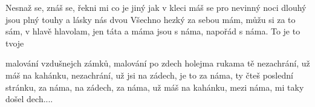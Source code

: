 \resetVars
{}
\MakeHeader
\Lyrics

Nesnaž se, znáš se,
řekni mi co je jiný
jak v kleci máš se
pro nevinný
noci dlouhý jsou plný touhy
a lásky nás dvou
Všechno hezký za sebou mám,
můžu si za to sám,
v hlavě hlavolam,
jen táta a máma jsou s náma,
napořád s náma. To je to tvoje

malování vzdušnejch zámků,
malování po zdech holejma rukama tě
nezachrání, už máš na kahánku,
nezachrání, už jsi na zádech,
je to za náma, ty čteš poslední stránku,
za náma, na zádech,
za náma, už máš na kahánku,
mezi náma, mi taky došel dech....





\Next
